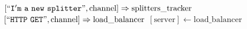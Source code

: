 \documentclass{article}
\begin{document}
\pagestyle{empty}

\newcommand{\send}{\Rightarrow}
\newcommand{\sendto}{\rightarrow}
\newcommand{\recv}{\Leftarrow}
\algrenewcommand\textproc{\textrm}

\begin{algorithmic}

  \algrenewcommand{}

  \State $[``\mathtt{I'm~a~new~splitter}", \text{channel}] \send \text{splitters\_tracker}$
  \State $[``\mathtt{HTTP~GET}", \text{channel}] \send \text{load\_balancer}$
  \State $[\text{server}] \gets \text{load\_balancer}$
  \EndFunction
  

  \EndProcedure
\end{algorithmic}
\end{document}
